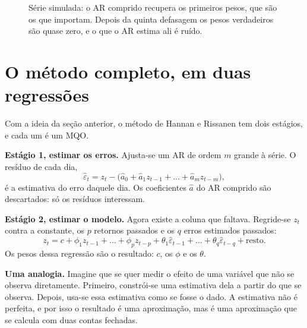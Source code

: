 \documentclass[11pt,a4paper]{article}
\newcommand{\arq}[1]{../../../dados/resultados/hannan_rissanen_2026-10-30/#1}
\begin{document}
\begin{figure}[htbp]\centering
{}
\caption{Série simulada: o AR comprido recupera os primeiros pesos, que são os que importam. Depois da quinta
defasagem os pesos verdadeiros são quase zero, e o que o AR estima ali é ruído.}
\label{fig:pesos}
\end{figure}

\section{O método completo, em duas regressões}\label{sec:metodo}

Com a ideia da seção anterior, o método de Hannan e Rissanen tem dois estágios, e cada um é um MQO.

\textbf{Estágio 1, estimar os erros.} Ajusta-se um AR de ordem $m$ grande à série. O resíduo de cada dia,
\[
  \hat\varepsilon_t = z_t - \bigl(\hat a_0 + \hat a_1 z_{t-1} + \dots + \hat a_m z_{t-m}\bigr),
\]
é a estimativa do erro daquele dia. Os coeficientes $\hat a$ do AR comprido são descartados: só os resíduos
interessam.

\textbf{Estágio 2, estimar o modelo.} Agora existe a coluna que faltava. Regride-se $z_t$ contra a constante, os $p$
retornos passados e os $q$ erros estimados passados:
\[
  z_t = c + \phi_1 z_{t-1} + \dots + \phi_p z_{t-p} + \theta_1 \hat\varepsilon_{t-1} + \dots + \theta_q \hat\varepsilon_{t-q} + \text{resto}.
\]
Os pesos dessa regressão são o resultado: $c$, os $\phi$ e os $\theta$.

\textbf{Uma analogia.} Imagine que se quer medir o efeito de uma variável que não se observa diretamente. Primeiro,
constrói-se uma estimativa dela a partir do que se observa. Depois, usa-se essa estimativa como se fosse o dado. A
estimativa não é perfeita, e por isso o resultado é uma aproximação, mas é uma aproximação que se calcula com duas
contas fechadas.
\end{document}
